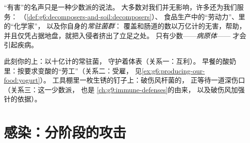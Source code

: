 \begin{proposition}\label{prop:g9:microbes-and-infection:mostly}
“有害”的名声只是一种少数派的说法。
大多数对我们并无影响，许多还为我们服务：
（\cref{def:g6:decomposers-and-soil:decomposers}）、
食品生产中的“劳动力”、里的“化学家”，
以及你自身的\emph{常驻菌群}：
覆盖和肠道的数以万亿计的无害，帮助，
并且仅凭占据地盘，就把入侵者挤出了立足之处。
只有少数——\emph{病原体}——
才会引起疾病。
\end{proposition}
\admitted

\begin{example}\label{ex:g9:microbes-and-infection:relations}
此刻你的上：以十亿计的常驻菌，
守护着体表（关系一：互利）。
早餐的酸奶里：按要求变酸的“劳工”（关系二：受雇，
见\cref{ex:g6:producing-our-food:yogurt}）。
工具棚里一枚生锈的钉子上：破伤风杆菌的，
正等待一道深伤口（关系三：这一少数派，
也是
\cref{ch:g9:immune-defenses}的由来，
以及破伤风加强针的依据）。
\end{example}

\section{感染：分阶段的攻击}

